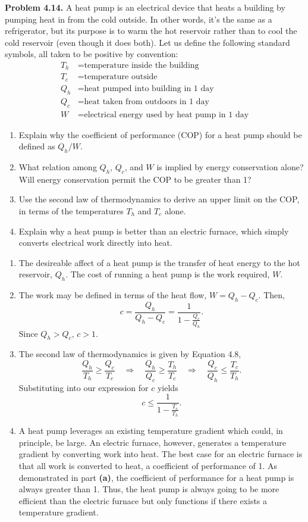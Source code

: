 \documentclass[a4paper, 12pt]{config/homework}
\begin{document}
\pagebreak\noindent
\textbf{Problem 4.14.} A heat pump is an electrical device that heats a building by pumping heat in from the cold outside. In other words, it's the same as a refrigerator, but its purpose is to warm the hot reservoir rather than to cool the cold reservoir (even though it does both). Let us define the following standard symbols, all taken to be positive by convention:
\begin{align*}
   T_h &= \text{temperature inside the building}
\\ T_c &= \text{temperature outside}
\\ Q_h &= \text{heat pumped into building in 1 day}
\\ Q_c &= \text{heat taken from outdoors in 1 day}
\\ W   &= \text{electrical energy used by heat pump in 1 day}
\end{align*}
\begin{enumerate}[label=\textbf{(\alph*)}]
\item Explain why the coefficient of performance (COP) for a heat pump should be defined as \(Q_h/W\).
\item What relation among \(Q_h\), \(Q_c\), and \(W\) is implied by energy conservation alone? Will energy conservation permit the COP to be greater than 1?
\item Use the second law of thermodynamics to derive an upper limit on the COP, in terms of the temperatures \(T_h\) and \(T_c\) alone.
\item Explain why a heat pump is better than an electric furnace, which simply converts electrical work directly into heat.
\end{enumerate}
\begin{enumerate}[label=\textbf{(\alph*)}]
\pagebreak
\item The desireable affect of a heat pump is the transfer of heat energy to the hot reservoir, \(Q_h\). The cost of running a heat pump is the work required, \(W\).
\bigskip
\item The work may be defined in terms of the heat flow, \(W=Q_h - Q_c\). Then,
\[c = \frac{Q_h}{Q_h - Q_c} = \frac{1}{1 - \frac{Q_c}{Q_h}}.\]
Since \(Q_h > Q_c\), \(c > 1\).
\bigskip
\item The second law of thermodynamics is given by Equation 4.8,
\[\frac{Q_h}{T_h} \ge \frac{Q_c}{T_c}
\quad\Rightarrow\quad \frac{Q_h}{Q_c}\ge\frac{T_h}{T_c}
\quad\Rightarrow\quad \frac{Q_c}{Q_h}\le\frac{T_c}{T_h}.\]
Substituting into our expression for \(c\) yields
\[c \le \frac{1}{1-\frac{T_c}{T_h}}.\]
\bigskip
\item A heat pump leverages an existing temperature gradient which could, in principle, be large. An electric furnace, however, generates a temperature gradient by converting work into heat. The best case for an electric furnace is that all work is converted to heat, a coefficient of performance of 1. As demonstrated in part \textbf{(a)}, the coefficient of performance for a heat pump is always greater than 1. Thus, the heat pump is always going to be more efficient than the electric furnace but only functions if there exists a temperature gradient.
\end{enumerate}
\end{document}
